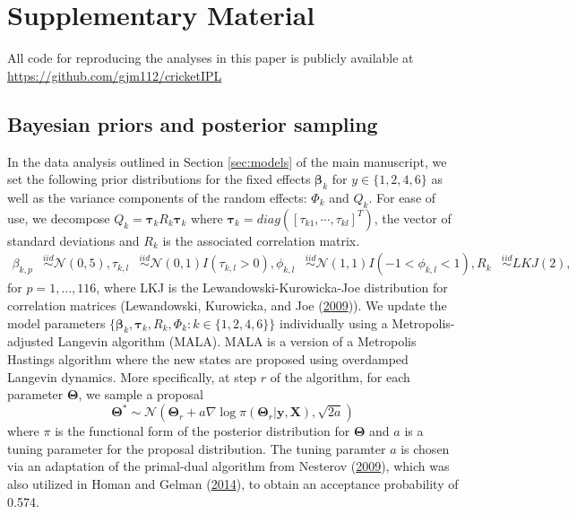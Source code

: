 \documentclass[
  12pt,
]{article}
\begin{document}
\hypertarget{supplementary-material}{%
\section*{Supplementary Material}\label{supplementary-material}}

All code for reproducing the analyses in this paper is publicly
available at \url{https://github.com/gjm112/cricketIPL}

\hypertarget{bayesian-priors-and-posterior-sampling}{%
\subsection{Bayesian priors and posterior
sampling}\label{bayesian-priors-and-posterior-sampling}}

In the data analysis outlined in Section \ref{sec:models} of the main
manuscript, we set the following prior distributions for the fixed
effects \(\boldsymbol{\beta}_k\) for \(y \in \{1,2,4,6\}\) as well as
the variance components of the random effects: \(\Phi_k\) and \(Q_k\).
For ease of use, we decompose
\(Q_k = \boldsymbol{\tau}_k R_k\boldsymbol{\tau}_k\) where
\(\boldsymbol{\tau}_k = diag([\tau_{k1},\cdots,\tau_{kl}]^T)\), the
vector of standard deviations and \(R_k\) is the associated correlation
matrix. \begin{align}
  \beta_{k,p} & \overset{iid}{\sim}\mathcal{N}(0,5),
  \tau_{k,l} & \overset{iid}{\sim}\mathcal{N}(0,1)I(\tau_{k,l} > 0),
  \phi_{k,l} & \overset{iid}{\sim}\mathcal{N}(1,1)I(-1 < \phi_{k,l} < 1),
  R_k & \overset{iid}{\sim}LKJ(2),
\end{align} for \(p = 1,\dots,116\), where LKJ is the
Lewandowski-Kurowicka-Joe distribution for correlation matrices
(Lewandowski, Kurowicka, and Joe (\protect\hyperlink{ref-LKJ}{2009})).
We update the model parameters
\(\{\boldsymbol{\beta}_k,\boldsymbol{\tau}_k,R_k,\Phi_k: k \in \{1,2,4,6\}\}\)
individually using a Metropolis-adjusted Langevin algorithm (MALA). MALA
is a version of a Metropolis Hastings algorithm where the new states are
proposed using overdamped Langevin dynamics. More specifically, at step
\(r\) of the algorithm, for each parameter \(\boldsymbol{\Theta}\), we
sample a proposal
\[\boldsymbol{\Theta}^* \sim \mathcal{N}\left(\boldsymbol{\Theta}_r + a\nabla \log \pi(\boldsymbol{\Theta}_r|\boldsymbol{y},\boldsymbol{X}), \sqrt{2a}\right)\]
where \(\pi\) is the functional form of the posterior distribution for
\(\boldsymbol{\Theta}\) and \(a\) is a tuning parameter for the proposal
distribution. The tuning paramter \(a\) is chosen via an adaptation of
the primal-dual algorithm from Nesterov
(\protect\hyperlink{ref-Nesterov2009}{2009}), which was also utilized in
Homan and Gelman (\protect\hyperlink{ref-NUTS}{2014}), to obtain an
acceptance probability of 0.574.
\end{document}
